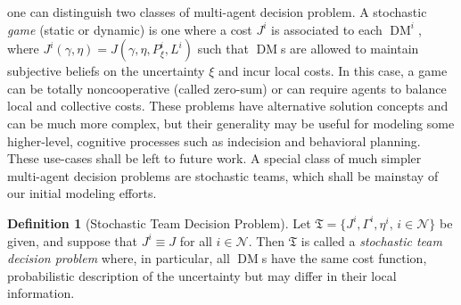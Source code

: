 \documentclass[12pt, oneside]{report}
\newcommand{\1}[1]{\mathbbm{1}_{\{#1\}}}
\newcommand{\mc}[1]{\mathcal{#1}}
\DeclareMathOperator{\DM}{DM} \DeclareMathOperator{\argmin}{argmin}
\theoremstyle{definition}
\newtheorem{definition}[theorem]{Definition}
\begin{document}
one can distinguish two classes of multi-agent decision problem. A stochastic
{\it game} (static or dynamic) is one where a cost $J^i$ is associated to each
$\DM^i$, where $J^i(\gamma,\eta)=J(\gamma,\eta,P^i_\xi,L^i)$ such that $\DM$s
are allowed to maintain subjective beliefs on the uncertainty $\xi$ and incur
local costs. In this case, a game can be totally noncooperative (called
zero-sum) or can require agents to balance local and collective costs. These
problems have alternative solution concepts and can be much more complex, but
their generality may be useful for modeling some higher-level, cognitive
processes such as indecision and behavioral planning. These use-cases shall be
left to future work. A special class of much simpler multi-agent decision
problems are stochastic teams, which shall be mainstay of our initial modeling
efforts.
\begin{definition}[Stochastic Team Decision Problem]\label{def3} Let
    $\mathfrak{T}=\{J^i,\Gamma^i,\eta^i,\,i\in\mc{N}\}$ be given, and suppose
    that $J^i\equiv J$ for all $i\in\mc{N}$. Then $\mathfrak{T}$ is called a
    {\it stochastic team decision problem} where, in particular, all $\DM$s have
    the same cost function, probabilistic description of the uncertainty but may
    differ in their local information. 
\end{definition}
\end{document}
